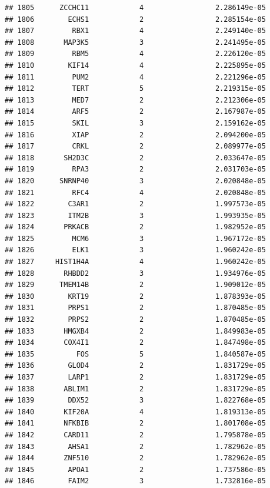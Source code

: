 \documentclass[
]{article}
\begin{document}
\begin{verbatim}
## 1805      ZCCHC11            4                 2.286149e-05
## 1806        ECHS1            2                 2.285154e-05
## 1807         RBX1            4                 2.249140e-05
## 1808       MAP3K5            3                 2.241495e-05
## 1809         RBM5            4                 2.226120e-05
## 1810        KIF14            4                 2.225895e-05
## 1811         PUM2            4                 2.221296e-05
## 1812         TERT            5                 2.219315e-05
## 1813         MED7            2                 2.212306e-05
## 1814         ARF5            2                 2.167987e-05
## 1815         SKIL            3                 2.159162e-05
## 1816         XIAP            2                 2.094200e-05
## 1817         CRKL            2                 2.089977e-05
## 1818       SH2D3C            2                 2.033647e-05
## 1819         RPA3            2                 2.031703e-05
## 1820      SNRNP40            3                 2.020848e-05
## 1821         RFC4            4                 2.020848e-05
## 1822        C3AR1            2                 1.997573e-05
## 1823        ITM2B            3                 1.993935e-05
## 1824       PRKACB            2                 1.982952e-05
## 1825         MCM6            3                 1.967172e-05
## 1826         ELK1            3                 1.960242e-05
## 1827     HIST1H4A            4                 1.960242e-05
## 1828       RHBDD2            3                 1.934976e-05
## 1829      TMEM14B            2                 1.909012e-05
## 1830        KRT19            2                 1.878393e-05
## 1831        PRPS1            2                 1.870485e-05
## 1832        PRPS2            2                 1.870485e-05
## 1833       HMGXB4            2                 1.849983e-05
## 1834       COX4I1            2                 1.847498e-05
## 1835          FOS            5                 1.840587e-05
## 1836        GLOD4            2                 1.831729e-05
## 1837        LARP1            2                 1.831729e-05
## 1838       ABLIM1            2                 1.831729e-05
## 1839        DDX52            3                 1.822768e-05
## 1840       KIF20A            4                 1.819313e-05
## 1841       NFKBIB            2                 1.801708e-05
## 1842       CARD11            2                 1.795878e-05
## 1843        AHSA1            2                 1.782962e-05
## 1844       ZNF510            2                 1.782962e-05
## 1845        APOA1            2                 1.737586e-05
## 1846        FAIM2            3                 1.732816e-05

\end{verbatim}
\end{document}
